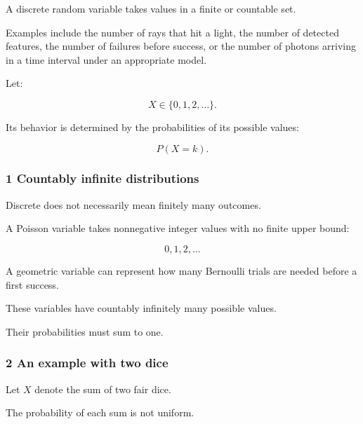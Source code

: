 \hypertarget{02-foundations-ii-ch023-discrete-random-variables}{}

A discrete random variable takes values in a finite or countable set.

Examples include the number of rays that hit a light, the number of detected features, the number of failures before success, or the number of photons arriving in a time interval under an appropriate model.

Let:

\[
 X\in\{0,1,2,\ldots\}.
\]

Its behavior is determined by the probabilities of its possible values:

\[
 P(X=k).
\]

\subsubsection{1 Countably infinite distributions}\label{02-foundations-ii-ch023-countably-infinite-distributions}

\hypertarget{02-foundations-ii-ch023-countably-infinite-distributions}{}

Discrete does not necessarily mean finitely many outcomes.

A Poisson variable takes nonnegative integer values with no finite upper bound:

\[
 0,1,2,\ldots
\]

A geometric variable can represent how many Bernoulli trials are needed before a first success.

These variables have countably infinitely many possible values.

Their probabilities must sum to one.

\subsubsection{2 An example with two dice}\label{02-foundations-ii-ch023-an-example-with-two-dice}

\hypertarget{02-foundations-ii-ch023-an-example-with-two-dice}{}

Let \(X\) denote the sum of two fair dice.

The probability of each sum is not uniform.

